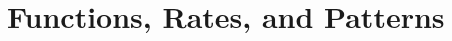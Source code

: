 \documentclass[../precalc.tex]{subfiles}
\begin{document}
\chapter{Functions, Rates, and Patterns}
\end{document}
